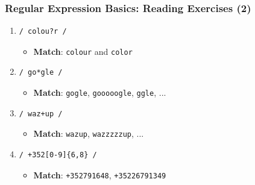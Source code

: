 \documentclass{beamer}
\begin{document}
\begin{frame}[fragile]
    \frametitle{Regular Expression Basics: Reading Exercises (2)}
    \begin{enumerate}
        \item \begin{verbatim}/ colou?r /\end{verbatim}
        \pause
        \begin{itemize}
            \item \textbf{Match}: \texttt{colour} and \texttt{color}
        \end{itemize}
        \item \begin{verbatim}/ go*gle /\end{verbatim}
        \pause
        \begin{itemize}
            \item \textbf{Match}: \texttt{gogle}, \texttt{gooooogle}, \texttt{ggle}, ...
        \end{itemize}
        \item \begin{verbatim}/ waz+up /\end{verbatim}
        \pause
        \begin{itemize}
            \item \textbf{Match}: \texttt{wazup}, \texttt{wazzzzzup}, ...
        \end{itemize}
        \item \begin{verbatim}/ +352[0-9]{6,8} /\end{verbatim}
        \pause
        \begin{itemize}
            \item \textbf{Match}: \texttt{+352791648}, \texttt{+35226791349}
        \end{itemize}
    \end{enumerate}
\end{frame}
\end{document}
